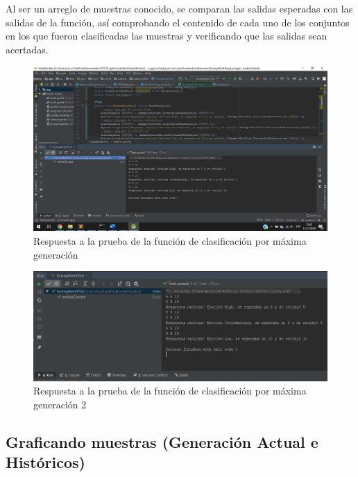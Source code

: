 Al ser un arreglo de muestras conocido, se comparan las salidas esperadas con las salidas de la función, así comprobando el contenido de cada uno de los conjuntos en los que fueron clasificadas las muestras y verificando que las salidas sean acertadas. 

\begin{figure}[H]
	\centering
	\includegraphics[scale=.4]{Capitulo5/images/PruebaMaxGeneracion.png}
	\caption{Respuesta a la prueba de la función de clasificación por máxima generación}	
	\label{fig:Codigo_de_colores}
\end{figure} 

\begin{figure}[H]
	\centering
	\includegraphics[scale=.4]{Capitulo5/images/PruebaMaxGeneracion2.png}
	\caption{Respuesta a la prueba de la función de clasificación por máxima generación 2}	
	\label{fig:Codigo_de_colores}
\end{figure} 



\subsection{Graficando  muestras (Generación Actual e Históricos)}
